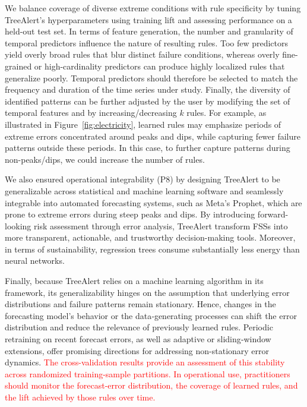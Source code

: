 \documentclass[]{interact}
\newcommand{\matt}[1]{\textcolor{red}{#1}}
\theoremstyle{definition}
\begin{document}
We balance coverage of diverse extreme conditions with rule specificity by tuning TreeAlert's hyperparameters using training lift and assessing performance on a held-out test set. In terms of feature generation, the number and granularity of temporal predictors influence the nature of resulting rules. Too few predictors yield overly broad rules that blur distinct failure conditions, whereas overly fine-grained or high-cardinality predictors can produce highly localized rules that generalize poorly. Temporal predictors should therefore be selected to match the frequency and duration of the time series under study. Finally, the diversity of identified patterns can be further adjusted by the user by modifying the set of temporal features and by increasing/decreasing $k$ rules. For example, as illustrated in Figure~\ref{fig:electricity}, learned rules may emphasize periods of extreme errors concentrated around peaks and dips, while capturing fewer failure patterns outside these periods. In this case, to further capture patterns during non-peaks/dips, we could increase the number of rules.

We also ensured operational integrability (P8) by designing TreeAlert to be generalizable across statistical and machine learning software and seamlessly integrable into automated forecasting systems, such as Meta's Prophet, which are prone to extreme errors during steep peaks and dips. By introducing forward-looking risk assessment through error analysis, TreeAlert transform FSSs into more transparent, actionable, and trustworthy decision-making tools. Moreover, in terms of sustainability, regression trees consume substantially less energy than neural networks.

Finally, because TreeAlert relies on a machine learning algorithm in its framework, its generalizability hinges on the assumption that underlying error distributions and failure patterns remain stationary. Hence, changes in the forecasting model's behavior or the data‑generating processes can shift the error distribution and reduce the relevance of previously learned rules. Periodic retraining on recent forecast errors, as well as adaptive or sliding‑window extensions, offer promising directions for addressing non-stationary error dynamics. \matt{The cross-validation results provide an assessment of this stability across randomized training-sample partitions. In operational use, practitioners should monitor the forecast-error distribution, the coverage of learned rules, and the lift achieved by those rules over time.}
\end{document}
